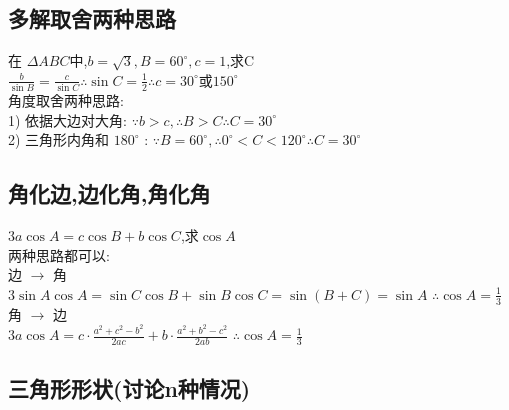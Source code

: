 \documentclass[hyperref, UTF8,11pt,a4paper]{ctexart} %
\begin{document}
\subsection{多解取舍两种思路}
{\color{red} 在 $\Delta A B C$中,$b=\sqrt{3}, B=60^{\circ}, c=1$,求C } \\
$ \frac{b}{\sin B}=\frac{c}{\sin C} \therefore \sin C=\frac{1}{2} \therefore c=30^{\circ}$或$150^{\circ}$ \\
角度取舍两种思路:\\
1) 依据大边对大角:  \quad
$\because b>c,  \therefore B>C \therefore C=30^{\circ}$ \\
2) 三角形内角和 $180^{\circ}$ : \quad
$ \because   B=60^{\circ}, \therefore 0^{\circ}<C<120^{\circ}  \therefore C=30^{\circ}$ \\


\subsection{角化边,边化角,角化角}
{\color{red} $3a\cos A=c\cos B+b\cos C$,求$\cos A $} \\
两种思路都可以: \\
边 $\rightarrow$ 角 \\
$3 \sin A \cos A=\sin C \cos B+\sin B \cos C =\sin (B+C) =\sin A$
$\therefore   \cos A=\frac{1}{3}$ \\
角 $\rightarrow$ 边	 \\
$3 a \cos A=c \cdot \frac{a^{2}+c^{2}-b^{2}}{2 a c}+b \cdot \frac{a^{2}+b^{2}-c^{2}}{2 a b}$
$\therefore  \cos A=\frac{1}{3}$ \\


\subsection{三角形形状(讨论n种情况)}
\end{document}
